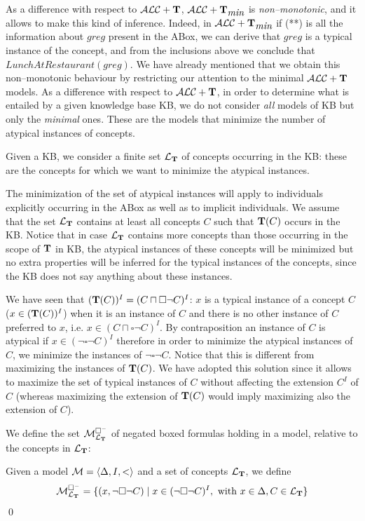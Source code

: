 \documentclass[a4paper, 11pt, oneside]{duthesis}
\newcommand{\tip}{{\bf T}}
\newcommand{\alct}{\mathcal{ALC}+\tip}
\newcommand{\alctmin}{\mathcal{ALC}+\tip_{\mbox{\em min}}}
\newcommand{\nott} {\lnot}
\newcommand{\tc} {\mid}
\newcommand{\bbox}{\square}
\newcommand{\sx} {\langle}
\newcommand{\dx} {\rangle}
\newcommand{\ellet} {\mathcal{L}_{\bf T}}
\newcommand{\emme} {\begin{mathcal}M\end{mathcal}}
\newenvironment{definition}
{\begin{defi} \rm}{\qed \end{defi}}
\newenvironment{definition}
{\begin{defi} \rm}{\qed \end{defi}}
\newtheorem{definition}{Definition}
\newcounter{posu}
\newtheorem{definition}[posu]{Definition}
\begin{document}
As a difference with respect to $\alct$, $\alctmin$ is {\em non--monotonic}, and it allows to make this kind of inference.
Indeed, in $\alctmin$ if (**) is all the information about $\mathit{greg}$ present in the ABox, we can derive that $\mathit{greg}$ is a typical instance of the concept, and from the inclusions above we conclude that $\mathit{LunchAtRestaurant(\mathit{greg})}.$
We have already mentioned that we obtain this non--monotonic behaviour by restricting our attention to the  minimal $\alct$ models.
As a difference with respect to $\alct$, in order to determine what is entailed by a given knowledge base KB, we do not consider {\em all} models of KB but only the {\em minimal} ones.
These are the models that minimize the number of atypical instances of concepts.

Given a KB, we consider a finite set $\ellet$ of concepts occurring in the KB: these are the concepts for which we want to minimize the atypical instances.

The minimization of the set of atypical instances will apply to individuals explicitly occurring in the ABox as well as to implicit individuals.
We assume that the set $\ellet$ contains at least all concepts $C$ such that $\tip(C)$ occurs in the KB.
Notice that in case $\ellet$ contains more concepts than those occurring in the scope of $\tip$ in KB, the atypical instances of these concepts will be minimized but no extra properties will be inferred for the typical instances of the concepts, since the KB does not say anything about these instances.

We have seen that $(\tip(C))^I =(C \sqcap \bbox \neg C)^I$: $x$ is a typical instance  of a concept $C$ ($x \in (\tip(C))^I$) when it is an instance of $C$  and there is no other instance of $C$ preferred to $x$, i.e. $x \in (C \sqcap \bbox \neg C)^I$.
By contraposition an instance of $C$ is atypical if $x \in (\neg \bbox \neg C)^I$ therefore in order to minimize the atypical instances of $C$, we minimize the instances of $\neg \bbox \neg C$.
Notice that this is different from maximizing the instances of $\tip(C)$.
We have adopted this solution since it allows to maximize the set of typical instances of $C$ without affecting the extension $C^I$ of $C$ (whereas maximizing the extension of $\tip(C)$  would imply maximizing also the extension of $C$).

We define the set $\emme^{\bbox^-}_{\ellet}$ of negated boxed formulas holding in a model, relative to the concepts in $\ellet$:

\begin{definition}
Given a model $\emme=\sx \Delta, I, <\dx$ and a set of concepts $\ellet$, we define $$\emme^{\bbox^-}_{\ellet}=\{(x, \nott \bbox \nott C) \tc x \in (\nott \bbox \nott C)^I, \ \mbox{with} \ x \in \Delta, C \in \ellet \}$$
\end{definition}
\end{document}
